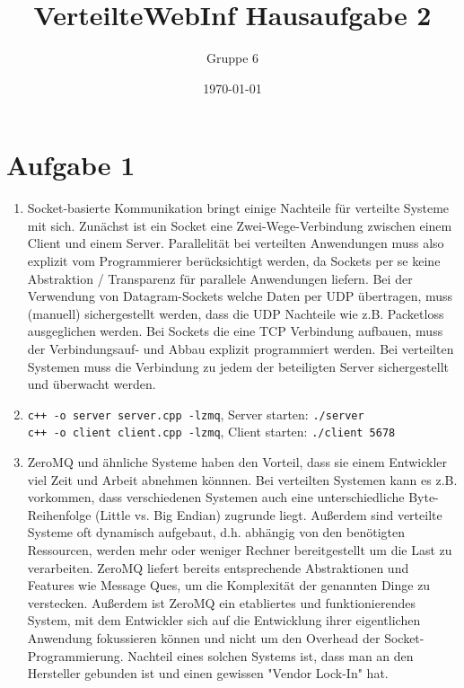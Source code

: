 \documentclass[a4paper]{article}
\author{Gruppe 6}
\title{\textbf{VerteilteWebInf Hausaufgabe 2}}
\date{\today}
\begin{document}
\maketitle

\section*{Aufgabe 1}
\begin{enumerate}[label=\alph*)]
\item Socket-basierte Kommunikation bringt einige Nachteile für verteilte Systeme mit sich. Zunächst ist ein Socket eine Zwei-Wege-Verbindung zwischen einem Client und einem Server. Parallelität bei verteilten Anwendungen muss also explizit vom Programmierer berücksichtigt werden, da Sockets per se keine Abstraktion / Transparenz für parallele Anwendungen liefern.  
Bei der Verwendung von Datagram-Sockets welche Daten per UDP übertragen, muss (manuell) sichergestellt werden, dass die UDP Nachteile wie z.B. Packetloss ausgeglichen werden. Bei Sockets die eine TCP Verbindung aufbauen, muss der Verbindungsauf- und Abbau explizit programmiert werden. Bei verteilten Systemen muss die Verbindung zu jedem der beteiligten Server sichergestellt und überwacht werden. 

\item \texttt{c++ -o server server.cpp -lzmq}, Server starten: \texttt{./server}\\
\texttt{c++ -o client client.cpp  -lzmq}, Client starten: \texttt{./client 5678}

\item ZeroMQ und ähnliche Systeme haben den Vorteil, dass sie einem Entwickler viel Zeit und Arbeit abnehmen könnnen. Bei verteilten Systemen kann es z.B. vorkommen, dass verschiedenen Systemen auch eine unterschiedliche Byte-Reihenfolge (Little vs. Big Endian) zugrunde liegt. Außerdem sind verteilte Systeme oft dynamisch aufgebaut, d.h. abhängig von den benötigten Ressourcen, werden mehr oder weniger Rechner bereitgestellt um die Last zu verarbeiten. ZeroMQ liefert bereits entsprechende Abstraktionen und Features wie Message Ques, um die Komplexität der genannten Dinge zu verstecken. Außerdem ist ZeroMQ ein etabliertes und funktionierendes System, mit dem Entwickler sich auf die Entwicklung ihrer eigentlichen Anwendung fokussieren können und nicht um den Overhead der Socket-Programmierung. Nachteil eines solchen Systems ist, dass man an den Hersteller gebunden ist und einen gewissen "Vendor Lock-In" hat.  


\end{enumerate}
\end{document}
